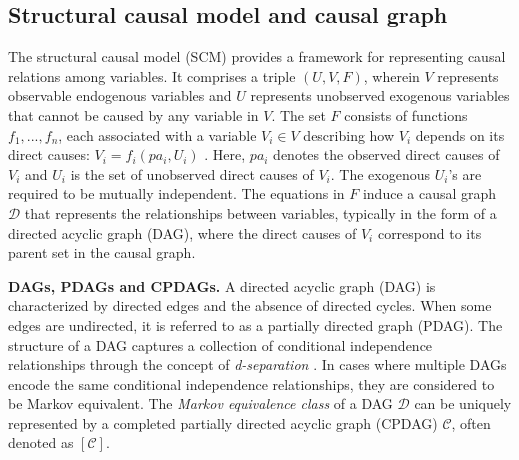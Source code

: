 \documentclass{article} %
\begin{document}





\subsection{Structural causal model and causal graph}

The structural causal model (SCM) \citep{pearl2000models} provides a framework for representing causal relations among variables. It comprises a triple $(U,V,F)$, wherein $V$ represents observable endogenous variables and $U$ represents unobserved exogenous variables that cannot be caused by any variable in $V$. The set $F$ consists of functions ${f_1,...,f_n}$, each associated with a variable $V_i \in V$ describing how $V_i$ depends on its direct causes:
$
V_i = f_i(pa_i, U_i)
$ .
Here, $pa_i$ denotes the observed direct causes of $V_i$ and $U_i$ is the set of unobserved direct causes of $V_i$. The exogenous $U_i$'s are required to be mutually independent. The equations in $F$ induce a causal graph $\mathcal{D}$ that represents the relationships between variables, typically in the form of a directed acyclic graph (DAG), where the direct causes of $V_i$ correspond to its parent set in the causal graph.

\textbf{DAGs, PDAGs and CPDAGs.} A directed acyclic graph (DAG) is characterized by directed edges and the absence of directed cycles. When some edges are undirected, it is referred to as a partially directed graph (PDAG). The structure of a DAG captures a collection of conditional independence relationships through the concept of \textit{d-separation} \citep{pearl1988probabilistic}. In cases where multiple DAGs encode the same conditional independence relationships, they are considered to be Markov equivalent. The \textit{Markov equivalence class} of a DAG $\mathcal{D}$ can be uniquely represented by a completed partially directed acyclic graph (CPDAG) $\mathcal{C}$, often denoted as $[\mathcal{C}]$.
\end{document}
